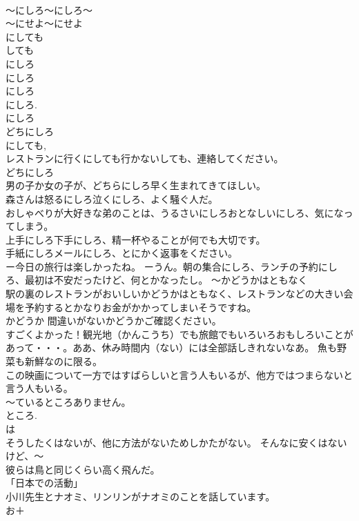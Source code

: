 \documentclass[8pt]{extreport}
\begin{document}
\begin{CJK}{UTF8}{min}
\\	～にしろ～にしろ～ 
\\	～にせよ～にせよ 
\\	にしても 
\\	しても 
\\	にしろ
\\	にしろ 
\\	にしろ
\\	にしろ. 
\\	にしろ 
\\	どちにしろ 
\\	にしても, 
\\	レストランに行くにしても行かないしても、連絡してください。 
\\	どちにしろ 
\\	男の子か女の子が、どちらにしろ早く生まれてきてほしい。 
\\	森さんは怒るにしろ泣くにしろ、よく騒ぐ人だ。 
\\	おしゃべりが大好きな弟のことは、うるさいにしろおとなしいにしろ、気になってしまう。 
\\	上手にしろ下手にしろ、精一杯やることが何でも大切です。 
\\	手紙にしろメールにしろ、とにかく返事をください。 
\\	ー今日の旅行は楽しかったね。 ーうん。朝の集合にしろ、ランチの予約にしろ、最初は不安だったけど、何とかなったし。 ～かどうかはともなく 
\\	駅の裏のレストランがおいしいかどうかはともなく、レストランなどの大きい会場を予約するとかなりお金がかかってしまいそうですね。 
\\	かどうか 間違いがないかどうかご確認ください。
\\	すごくよかった！観光地（かんこうち）でも旅館でもいろいろおもしろいことがあって・・・。ああ、休み時間内（ない）には全部話しきれないなあ。 魚も野菜も新鮮なのに限る。 
\\	この映画について一方ではすばらしいと言う人もいるが、他方ではつまらないと言う人もいる。 
\\	～ているところありません。	
\\	ところ. 
\\	は	
\\	そうしたくはないが、他に方法がないためしかたがない。 そんなに安くはないけど、～
\\	彼らは鳥と同じくらい高く飛んだ。
\\	「日本での活動」
\\	小川先生とナオミ、リンリンがナオミのことを話しています。
\\	お＋

\end{CJK}
\end{document}
